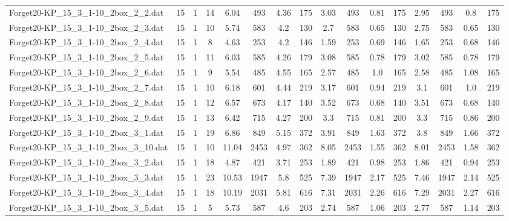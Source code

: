 \begin{sidewaystable}[!ht]
{\begin{tabular}{lccccccccccccccc}
Forget20-KP\_15\_3\_1-10\_2box\_2\_2.dat & 15 & 1 & 14 & 6.04 & 493 & 4.36 & 175 & 3.03 & 493 & 0.81 & 175 & 2.95 & 493 &  \textcolor{blue2}{0.8} & 175 \\
Forget20-KP\_15\_3\_1-10\_2box\_2\_3.dat & 15 & 1 & 10 & 5.74 & 583 & 4.2 & 130 & 2.7 & 583 &  \textcolor{blue2}{0.65} & 130 & 2.75 & 583 &  \textcolor{blue2}{0.65} & 130 \\
Forget20-KP\_15\_3\_1-10\_2box\_2\_4.dat & 15 & 1 & 8 & 4.63 & 253 & 4.2 & 146 & 1.59 & 253 & 0.69 & 146 & 1.65 & 253 & 0.68 & 146 \\
Forget20-KP\_15\_3\_1-10\_2box\_2\_5.dat & 15 & 1 & 11 & 6.03 & 585 & 4.26 & 179 & 3.08 & 585 &  \textcolor{blue2}{0.78} & 179 & 3.02 & 585 &  \textcolor{blue2}{0.78} & 179 \\
Forget20-KP\_15\_3\_1-10\_2box\_2\_6.dat & 15 & 1 & 9 & 5.54 & 485 & 4.55 & 165 & 2.57 & 485 & 1.0 & 165 & 2.58 & 485 & 1.08 & 165 \\
Forget20-KP\_15\_3\_1-10\_2box\_2\_7.dat & 15 & 1 & 10 & 6.18 & 601 & 4.44 & 219 & 3.17 & 601 & 0.94 & 219 & 3.1 & 601 & 1.0 & 219 \\
Forget20-KP\_15\_3\_1-10\_2box\_2\_8.dat & 15 & 1 & 12 & 6.57 & 673 & 4.17 & 140 & 3.52 & 673 &  \textcolor{blue2}{0.68} & 140 & 3.51 & 673 &  \textcolor{blue2}{0.68} & 140 \\
Forget20-KP\_15\_3\_1-10\_2box\_2\_9.dat & 15 & 1 & 13 & 6.42 & 715 & 4.27 & 200 & 3.3 & 715 &  \textcolor{blue2}{0.81} & 200 & 3.3 & 715 & 0.86 & 200 \\
Forget20-KP\_15\_3\_1-10\_2box\_3\_1.dat & 15 & 1 & 19 & 6.86 & 849 & 5.15 & 372 & 3.91 & 849 & 1.63 & 372 & 3.8 & 849 & 1.66 & 372 \\
Forget20-KP\_15\_3\_1-10\_2box\_3\_10.dat & 15 & 1 & 10 & 11.04 & 2453 & 4.97 & 362 & 8.05 & 2453 & 1.55 & 362 & 8.01 & 2453 & 1.58 & 362 \\
Forget20-KP\_15\_3\_1-10\_2box\_3\_2.dat & 15 & 1 & 18 & 4.87 & 421 & 3.71 & 253 & 1.89 & 421 & 0.98 & 253 & 1.86 & 421 & 0.94 & 253 \\
Forget20-KP\_15\_3\_1-10\_2box\_3\_3.dat & 15 & 1 & 23 & 10.53 & 1947 & 5.8 & 525 & 7.39 & 1947 & 2.17 & 525 & 7.46 & 1947 &  \textcolor{blue2}{2.14} & 525 \\
Forget20-KP\_15\_3\_1-10\_2box\_3\_4.dat & 15 & 1 & 18 & 10.19 & 2031 & 5.81 & 616 & 7.31 & 2031 & 2.26 & 616 & 7.29 & 2031 & 2.27 & 616 \\
Forget20-KP\_15\_3\_1-10\_2box\_3\_5.dat & 15 & 1 & 5 & 5.73 & 587 & 4.6 & 203 & 2.74 & 587 & 1.06 & 203 & 2.77 & 587 & 1.14 & 203 \\

\end{tabular}}
\end{sidewaystable}
